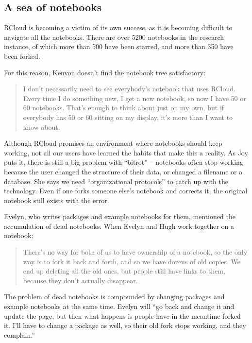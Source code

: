 \subsection{A sea of notebooks}
RCloud is becoming a victim of its own success, as it is becoming
difficult to navigate all the notebooks.  There are over 5200 notebooks in
the research instance, of which more than 500 have been starred, and more
than 350 have been forked.

For this reason, Kenyon doesn't find the notebook tree satisfactory:
\begin{quote}
I don't necessarily need to see everybody's notebook that uses RCloud. Every
time I do something new, I get a new notebook, so now I have 50 or 60 notebooks.
That's enough to think about just on my own, but if everybody has
50 or 60 sitting on my display, it's more than I want to know about.
\end{quote}

Although RCloud promises an environment where notebooks should keep working,
not all our users have learned the habits that make this a reality. As Joy
puts it, there is still a big problem with ``bitrot'' -- notebooks often
stop working because the user changed the structure of their data, or
changed a filename or a database.  She says we need ``organizational
protocols'' to catch up with the technology. Even if one forks someone
else's notebook and corrects it, the original notebook still exists with
the error.


Evelyn, who writes packages and example notebooks for them, mentioned the
accumulation of dead notebooks. When Evelyn and Hugh work together on a notebook:
\begin{quote}
There's no way for both of us to have ownership of a notebook, so the only
way is to fork it back and forth, and so we have dozens of old copies. We
end up deleting all the old ones, but people still have links to them,
because they don't actually disappear.
\end{quote}

The problem of dead notebooks is compounded by changing
packages and example notebooks at the same time. Evelyn will ``go back and
change it and update the page, but then what happens is people have in the
meantime forked it. I'll have to change a package as well, so their
old fork stops working, and they complain.''

